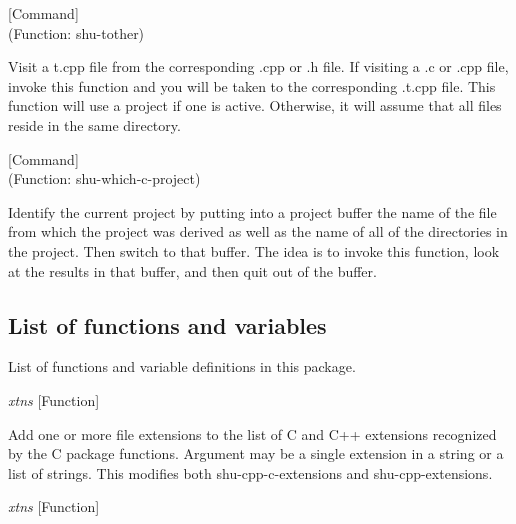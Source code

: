 \vspace{1em}
\noindent
{}
\usebox{\funcname}
 \hfill [Command]\\%
 (Function: shu-tother)

\begin{doc-string}
Visit a t.cpp file from the corresponding .cpp or .h file.  If visiting a .c
or .cpp file, invoke this function and you will be taken to the corresponding
.t.cpp file.  This function will use a project if one is active.  Otherwise, it
will assume that all files reside in the same directory.
\end{doc-string}

\vspace{1em}
\noindent
{}
\usebox{\funcname}
 \hfill [Command]\\%
 (Function: shu-which-c-project)

\begin{doc-string}
Identify the current project by putting into a project buffer the name of the file
from which the project was derived as well as the name of all of the directories in the
project.  Then switch to that buffer.  The idea is to invoke this function, look at the
results in that buffer, and then quit out of the buffer.
\end{doc-string}

\subsection{List of functions and variables}

List of functions and variable definitions in this package.



\vspace{1em}
\noindent
{}
\usebox{\funcname}\emph{xtns}
 \hfill [Function]

\begin{doc-string}
Add one or more file extensions to the list of C and C++ extensions recognized by the
C package functions.  Argument may be a single extension in a string or a list of strings.
This modifies both shu-cpp-c-extensions and shu-cpp-extensions.
\end{doc-string}

\vspace{1em}
\noindent
{}
\usebox{\funcname}\emph{xtns}
 \hfill [Function]


